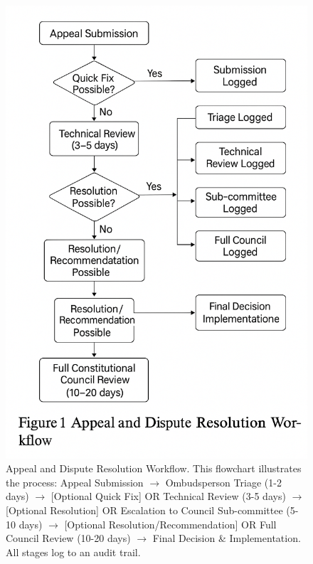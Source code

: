 \documentclass[manuscript,screen,review,anonymous,9pt]{acmart}
\begin{document}
\begin{figure}[htbp]
	\centering
	\includegraphics[width=\linewidth,keepaspectratio]{Figure 1_ Appeal and Dispute Resolution Workflow.png}
	\caption[Appeal and dispute resolution workflow diagram]{Appeal and Dispute Resolution Workflow. This flowchart illustrates the process: Appeal Submission $\rightarrow$ Ombudsperson Triage (1-2 days) $\rightarrow$ [Optional Quick Fix] OR Technical Review (3-5 days) $\rightarrow$ [Optional Resolution] OR Escalation to Council Sub-committee (5-10 days) $\rightarrow$ [Optional Resolution/Recommendation] OR Full Council Review (10-20 days) $\rightarrow$ Final Decision \& Implementation. All stages log to an audit trail.}
	\label{fig:appeal_workflow}
\end{figure}
\end{document}
